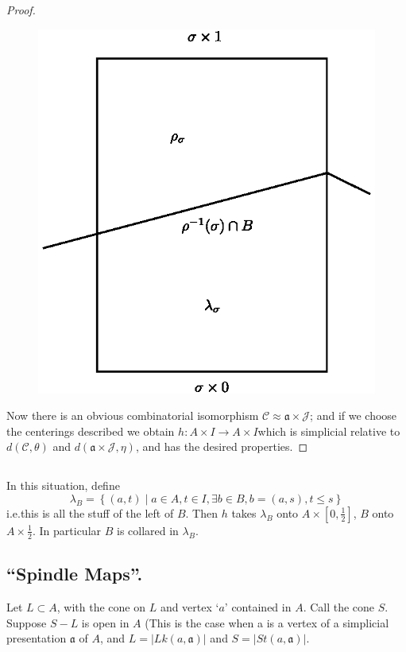 \begin{proof}
\begin{figure}[H]
\centering
\includegraphics{figure/fig12.eps}
\end{figure}

Now there is an obvious combinatorial isomorphism $\mathscr{C}\approx \mathfrak{a}\times\mathscr{J}$; and if we choose the centerings described we obtain
$h:A\times I\to A\times I$\pageoriginale which is simplicial relative to $d(\mathscr{C},\theta)$ and $d(\mathfrak{a}\times\mathscr{J},\eta)$, and has the desired properties.
\end{proof}

\setcounter{subsection}{12}
\subsection{}\label{chap6-sec6.4.13}
In this situation, define 
$$
\lambda_{B}=\left\{(a,t)\mid a\in A, t\in I, \exists b\in B,b=(a,s),t\leq s\right\}
$$
i.e.\@ this is all the stuff of the left of $B$. Then $h$ takes $\lambda_{B}$ onto $A\times[0,\frac{1}{2}]$, $B$ onto $A\times\frac{1}{2}$. In particular $B$ is collared in $\lambda_{B}$.

\subsection{``Spindle Maps''.}\label{chap6-sec6.4.14}
Let $L\subset A$, with the cone on $L$ and vertex `$a$' contained in $A$. Call the cone $S$. Suppose $S-L$ is open in $A$ (This is the case when a is a vertex of a simplicial presentation $\mathfrak{a}$ of $A$, and $L=|Lk(a,\mathfrak{a})|$ and $S=|St(a,\mathfrak{a})|$.

